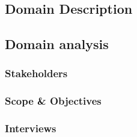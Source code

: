 \subsection{Domain Description} %
\label{sub:problem_description}
\subsection{Domain analysis} %
\subsubsection{Stakeholders} %
\subsubsection{Scope \& Objectives}
\subsubsection{Interviews} %

 